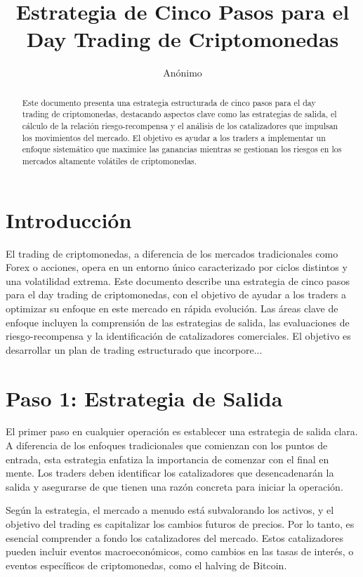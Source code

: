 \documentclass[12pt]{article}
\title{Estrategia de Cinco Pasos para el Day Trading de Criptomonedas}
\author{Anónimo}
\date{}
\begin{document}
\maketitle

\begin{abstract}
Este documento presenta una estrategia estructurada de cinco pasos para el day trading de criptomonedas, destacando aspectos clave como las estrategias de salida, el cálculo de la relación riesgo-recompensa y el análisis de los catalizadores que impulsan los movimientos del mercado. El objetivo es ayudar a los traders a implementar un enfoque sistemático que maximice las ganancias mientras se gestionan los riesgos en los mercados altamente volátiles de criptomonedas.
\end{abstract}

\section{Introducción}

El trading de criptomonedas, a diferencia de los mercados tradicionales como Forex o acciones, opera en un entorno único caracterizado por ciclos distintos y una volatilidad extrema. Este documento describe una estrategia de cinco pasos para el day trading de criptomonedas, con el objetivo de ayudar a los traders a optimizar su enfoque en este mercado en rápida evolución. Las áreas clave de enfoque incluyen la comprensión de las estrategias de salida, las evaluaciones de riesgo-recompensa y la identificación de catalizadores comerciales. El objetivo es desarrollar un plan de trading estructurado que incorpore...

\section{Paso 1: Estrategia de Salida}

    El primer paso en cualquier operación es establecer una estrategia de salida clara. A diferencia de los enfoques tradicionales que comienzan con los puntos de entrada, esta estrategia enfatiza la importancia de comenzar con el final en mente. Los traders deben identificar los catalizadores que desencadenarán la salida y asegurarse de que tienen una razón concreta para iniciar la operación.

    Según la estrategia, el mercado a menudo está subvalorando los activos, y el objetivo del trading es capitalizar los cambios futuros de precios. Por lo tanto, es esencial comprender a fondo los catalizadores del mercado. Estos catalizadores pueden incluir eventos macroeconómicos, como cambios en las tasas de interés, o eventos específicos de criptomonedas, como el halving de Bitcoin.
\end{document}
